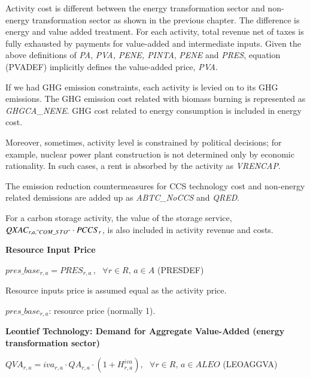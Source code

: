 \documentclass[10pt,a4paper,titlepage,dvipdfmx]{book}
\newif\ifAIMHubReviewMode
\newenvironment{changedblock}{\begingroup\ifAIMHubReviewMode\color{red}\fi}{\endgroup}
\begin{document}
Activity cost is different between the energy transformation sector and non-energy transformation sector as shown in the previous chapter. The difference is energy and value added treatment. For each activity, total revenue net of taxes is fully exhausted by payments for value-added and intermediate inputs. Given the above definitions of \textit{PA}, \textit{PVA, PENE, PINTA}, \textit{PENE} and \textit{PRES}, equation (PVADEF) implicitly defines the value-added price, \textit{PVA}.

     If we had GHG emission constraints, each activity is levied on to its GHG emissions. The GHG emission cost related with biomass burning is represented as \textit{GHGCA\_NENE}. GHG cost related to energy consumption is included in energy cost.

Moreover, sometimes, activity level is constrained by political decisions; for example, nuclear power plant construction is not determined only by economic rationality. In such cases, a rent is absorbed by the activity as \textit{VRENCAP}.

      The emission reduction countermeasures for CCS technology cost and non-energy related demissions are added up as \textit{ABTC\_NoCCS} and \textit{QRED}. 

\begin{changedblock}
For a carbon storage activity, the value of the storage service, $QXAC_{r,a,"COM\_STO"}\cdot PCCS_{r}$, is also included in activity revenue and costs.
\end{changedblock}

\begin{flushleft}\textbf{Resource Input Price}\end{flushleft}


\begin{center}$pres\_ base_{r,a}=PRES_{r,a}\,,\,\,\,\,\forall r\in R,\,a\in A$ (PRESDEF)
\end{center}

    Resource inputs price is assumed equal as the activity price.
\begin{flushleft}
$pres\_base_{r,a}$: resource price (normally 1).
\end{flushleft}

\begin{flushleft}\textbf{Leontief Technology: Demand for Aggregate Value-Added (energy transformation sector)}\end{flushleft}


\begin{center} $QVA_{r,a}=iva_{r,a}\cdot QA_{r,a}\cdot \left(1+H _{r,a}^{iva}\right),\,\,\,\,\forall r\in R,\,a\in ALEO$ (LEOAGGVA)
\end{center}
\end{document}
